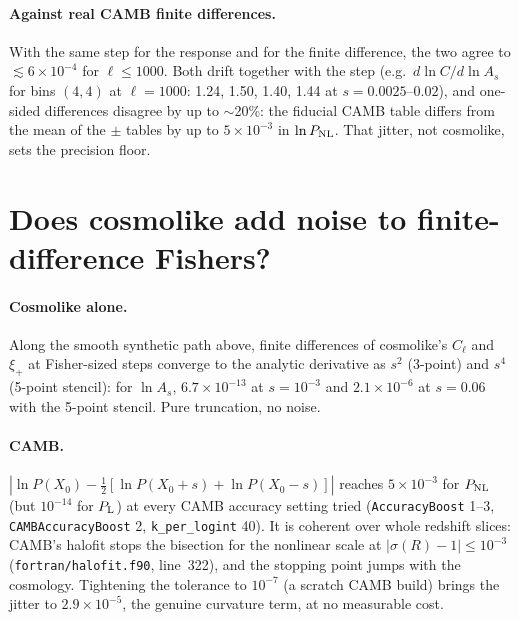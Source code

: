 \documentclass[11pt]{article}
\begin{document}
\paragraph{Against real CAMB finite differences.} With the same step for
the response and for the finite difference, the two agree to
$\lesssim6\times10^{-4}$ for $\ell\le1000$. Both drift together with the
step (e.g.\ $d\ln C/d\ln A_s$ for bins $(4,4)$ at $\ell=1000$: 1.24, 1.50,
1.40, 1.44 at $s=0.0025$--$0.02$), and one-sided differences disagree by
up to $\sim$20\%: the fiducial CAMB table differs from the mean of the $\pm$
tables by up to $5\times10^{-3}$ in $\ln P_{\rm NL}$. That jitter, not
cosmolike, sets the precision floor.

\section{Does cosmolike add noise to finite-difference Fishers?}\label{sec:noise}
\paragraph{Cosmolike alone.} Along the smooth synthetic path above, finite
differences of cosmolike's $C_\ell$ and $\xi_+$ at Fisher-sized steps
converge to the analytic derivative as $s^2$ (3-point) and $s^4$ (5-point
stencil): for $\ln A_s$, $6.7\times10^{-13}$ at $s=10^{-3}$ and
$2.1\times10^{-6}$ at $s=0.06$ with the 5-point stencil. Pure truncation, no
noise.

\paragraph{CAMB.} $|\ln P(X_0)-\tfrac12[\ln P(X_0{+}s)+\ln P(X_0{-}s)]|$
reaches $5\times10^{-3}$ for $P_{\rm NL}$ (but $10^{-14}$ for $P_{\rm L}$) at
every CAMB accuracy setting tried (\texttt{AccuracyBoost} 1--3,
\texttt{CAMBAccuracyBoost} 2, \texttt{k\_per\_logint} 40). It is coherent
over whole redshift slices: CAMB's halofit stops the bisection for the
nonlinear scale at $|\sigma(R)-1|\le10^{-3}$
(\texttt{fortran/halofit.f90}, line~322), and the stopping point jumps with
the cosmology. Tightening the tolerance to $10^{-7}$ (a scratch CAMB build)
brings the jitter to $2.9\times10^{-5}$, the genuine curvature term, at no
measurable cost.
\end{document}
